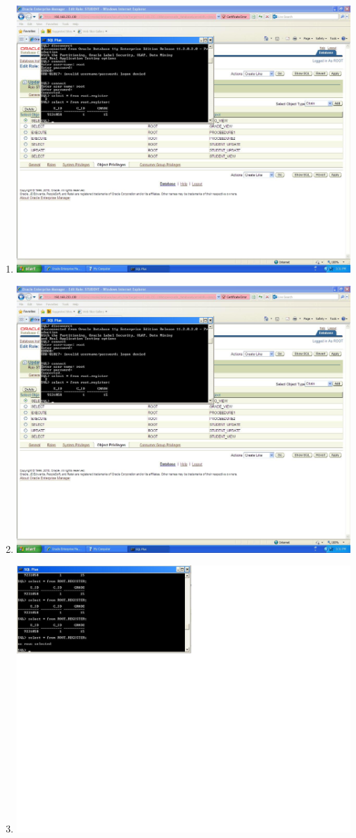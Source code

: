 \documentclass{article}
\begin{document}
\begin{enumerate}
	\item
		\includegraphics[scale=0.4]{figs/6.JPG}\underline{}
	\item
		\includegraphics[scale=0.4]{figs/7.JPG}\underline{}
	\item
		\includegraphics[scale=0.4]{figs/8.JPG}\underline{}

\end{enumerate}
\end{document}
